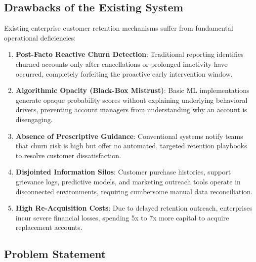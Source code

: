 \documentclass[12pt,a4paper]{article}
\begin{document}
\subsection{Drawbacks of the Existing System}\label{sub:2.1}

Existing enterprise customer retention mechanisms suffer from fundamental operational deficiencies:
\begin{enumerate}[leftmargin=20pt]
    \item \textbf{Post-Facto Reactive Churn Detection}: Traditional reporting identifies churned accounts only after cancellations or prolonged inactivity have occurred, completely forfeiting the proactive early intervention window.
    \item \textbf{Algorithmic Opacity (Black-Box Mistrust)}: Basic ML implementations generate opaque probability scores without explaining underlying behavioral drivers, preventing account managers from understanding why an account is disengaging.
    \item \textbf{Absence of Prescriptive Guidance}: Conventional systems notify teams that churn risk is high but offer no automated, targeted retention playbooks to resolve customer dissatisfaction.
    \item \textbf{Disjointed Information Silos}: Customer purchase histories, support grievance logs, predictive models, and marketing outreach tools operate in disconnected environments, requiring cumbersome manual data reconciliation.
    \item \textbf{High Re-Acquisition Costs}: Due to delayed retention outreach, enterprises incur severe financial losses, spending 5x to 7x more capital to acquire replacement accounts.
\end{enumerate}

\subsection{Problem Statement}\label{sub:2.2}
\end{document}
